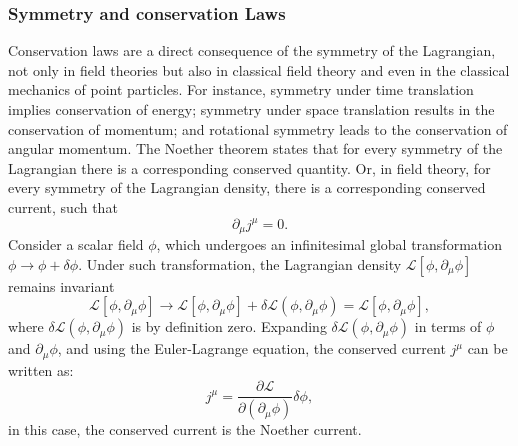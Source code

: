         \subsubsection{Symmetry and conservation Laws}
            Conservation laws are a direct consequence of the symmetry of the Lagrangian,
            not only in field theories but also in classical field theory and even in 
            the classical mechanics of point particles. For instance, symmetry under 
            time translation implies conservation of energy; symmetry under space 
            translation results in the conservation of momentum; and rotational 
            symmetry leads to the conservation of angular momentum. The Noether theorem
            states that for every symmetry of the Lagrangian
            there is a corresponding conserved quantity. Or, in field theory, for every
            symmetry of the Lagrangian density, there is a corresponding conserved current, 
            such that 
            \begin{equation}
                \partial_{\mu}j^{\mu} = 0.
            \end{equation}
            Consider a scalar field $\phi$, which undergoes an infinitesimal global transformation 
            $\phi \rightarrow \phi + \delta\phi$. Under such transformation, the Lagrangian density
            $\mathcal{L}[\phi, \partial_{\mu}\phi]$ remains invariant
            \begin{equation}
                \mathcal{L}[\phi, \partial_{\mu}\phi] \rightarrow \mathcal{L}[\phi, \partial_{\mu}\phi] + \delta\mathcal{L}(\phi, \partial_\mu\phi) = \mathcal{L}[\phi, \partial_{\mu}\phi],
            \end{equation}
            where $\delta\mathcal{L}(\phi, \partial_\mu\phi)$ is by definition zero. Expanding 
            $\delta\mathcal{L}(\phi, \partial_\mu\phi)$ in terms of $\phi$ and $\partial_\mu\phi$, 
            and using the Euler-Lagrange equation, the conserved current $j^{\mu}$ can be written as:
            \begin{equation}
                j^{\mu} = \frac{\partial \mathcal{L}}{\partial(\partial_{\mu}\phi)}\delta\phi,
            \end{equation}
            in this case, the conserved current is the Noether current.
